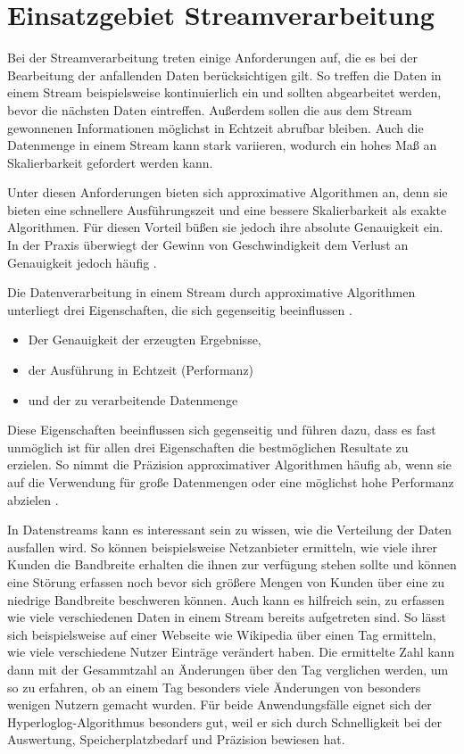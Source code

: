 \section{Einsatzgebiet Streamverarbeitung}
Bei der Streamverarbeitung treten einige Anforderungen auf, 
die es bei der Bearbeitung der anfallenden Daten berücksichtigen gilt. 
So treffen die Daten in einem Stream beispielsweise kontinuierlich ein und sollten abgearbeitet werden,
bevor die nächsten Daten eintreffen. 
Außerdem sollen die aus dem Stream gewonnenen Informationen möglichst in Echtzeit abrufbar bleiben.
Auch die Datenmenge in einem Stream kann stark variieren, wodurch ein hohes Maß an Skalierbarkeit gefordert werden kann.

Unter diesen Anforderungen bieten sich approximative Algorithmen an, denn sie bieten eine schnellere Ausführungszeit und eine bessere Skalierbarkeit als exakte Algorithmen. 
Für diesen Vorteil büßen sie jedoch ihre absolute Genauigkeit ein. 
In der Praxis überwiegt der Gewinn von Geschwindigkeit dem Verlust an Genauigkeit jedoch häufig \cite{Maas2019}. 

Die Datenverarbeitung in einem Stream durch approximative Algorithmen unterliegt drei Eigenschaften, 
die sich gegenseitig beeinflussen \cite{Maas2019}. 

\begin{itemize}
\item
Der Genauigkeit der erzeugten Ergebnisse,
\item
der Ausführung in Echtzeit (Performanz)
\item
und der zu verarbeitende Datenmenge
\end{itemize}

Diese Eigenschaften beeinflussen sich gegenseitig und führen dazu, 
dass es fast unmöglich ist für allen drei Eigenschaften die bestmöglichen Resultate zu erzielen.
So nimmt die Präzision approximativer Algorithmen häufig ab, 
wenn sie auf die Verwendung für große Datenmengen oder eine möglichst hohe Performanz abzielen \cite{Maas2019}.

In Datenstreams kann es interessant sein zu wissen, wie die Verteilung der Daten ausfallen wird. 
So können beispielsweise Netzanbieter ermitteln, 
wie viele ihrer Kunden die Bandbreite erhalten die ihnen zur verfügung stehen sollte 
und können eine Störung erfassen noch bevor sich größere Mengen von Kunden über eine zu niedrige Bandbreite beschweren können.
Auch kann es hilfreich sein, zu erfassen wie viele verschiedenen Daten in einem Stream bereits aufgetreten sind. 
So lässt sich beispielsweise auf einer Webseite wie Wikipedia über einen Tag ermitteln, 
wie viele verschiedene Nutzer Einträge verändert haben. 
Die ermittelte Zahl kann dann mit der Gesammtzahl an Änderungen über den Tag verglichen werden, 
um so zu erfahren, ob an einem Tag besonders viele Änderungen von  besonders wenigen Nutzern gemacht wurden.
Für beide Anwendungsfälle eignet sich der Hyperloglog-Algorithmus besonders gut, 
weil er sich durch Schnelligkeit bei der Auswertung, Speicherplatzbedarf und Präzision bewiesen hat. \cite{quelle}

